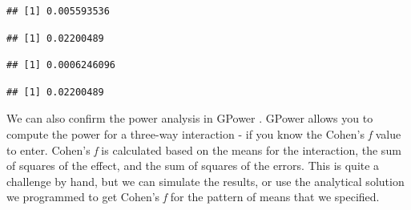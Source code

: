 \documentclass[]{book}
\newenvironment{Shaded}{\begin{snugshade}}{\end{snugshade}}
\newcommand{\CommentTok}[1]{\textcolor[rgb]{0.56,0.35,0.01}{\textit{#1}}}
\newcommand{\DecValTok}[1]{\textcolor[rgb]{0.00,0.00,0.81}{#1}}
\newcommand{\NormalTok}[1]{#1}
\newcommand{\OperatorTok}[1]{\textcolor[rgb]{0.81,0.36,0.00}{\textbf{#1}}}
\begin{document}
\begin{verbatim}
## [1] 0.005593536
\end{verbatim}

\begin{Shaded}
\end{Shaded}

\begin{verbatim}
## [1] 0.02200489
\end{verbatim}

\begin{Shaded}
\end{Shaded}

\begin{verbatim}
## [1] 0.0006246096
\end{verbatim}

\begin{Shaded}
\end{Shaded}

\begin{verbatim}
## [1] 0.02200489
\end{verbatim}

We can also confirm the power analysis in GPower \citep{faul2007g}. GPower allows you to compute the power for a three-way interaction - if you know the Cohen's \emph{f} value to enter. Cohen's \emph{f} is calculated based on the means for the interaction, the sum of squares of the effect, and the sum of squares of the errors. This is quite a challenge by hand, but we can simulate the results, or use the analytical solution we programmed to get Cohen's \emph{f} for the pattern of means that we specified.

\begin{Shaded}
\end{Shaded}
\end{document}
